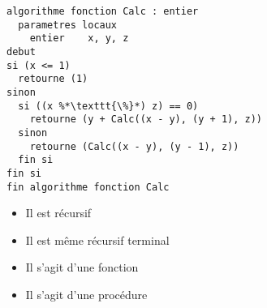 \documentclass[11pt,a4paper]{article}
\begin{document}

\begin{table}[!ht]
  \centering
  \begin{minipage}{0.645\textwidth}
    \centering

\begin{lstlisting}[style=algorithmique]
algorithme fonction Calc : entier
  parametres locaux
    entier    x, y, z
debut
si (x <= 1)
  retourne (1)
sinon
  si ((x %*\texttt{\%}*) z) == 0)
    retourne (y + Calc((x - y), (y + 1), z))
  sinon
    retourne (Calc((x - y), (y - 1), z))
  fin si
fin si
fin algorithme fonction Calc \end{lstlisting}

\begin{itemize}
  \item[\CaseCoche] Il est récursif  \phantom{Lg}\\
  \item[\CaseCoche] Il est même récursif terminal  \phantom{Lg}\\
  \item[\CaseCoche] Il s'agit d'une fonction  \phantom{Lg}\\
  \item[\CaseCoche] Il s'agit d'une procédure  \phantom{Lg}\\
\end{itemize}


  \end{minipage}
  \hfillx
  \begin{minipage}{0.33\textwidth}
    \centering


\end{minipage}
\end{table}
\end{document}
